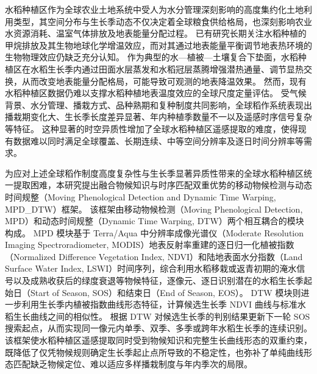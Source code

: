 \cleardoublepage
{}
水稻种植区作为全球农业土地系统中受人为水分管理深刻影响的高度集约化土地利用类型，其空间分布与生长季动态不仅决定着全球粮食供给格局，也深刻影响农业水资源消耗、温室气体排放及地表能量分配过程。
已有研究长期关注水稻种植的甲烷排放及其生物地球化学增温效应，而对其通过地表能量平衡调节地表热环境的生物物理效应仍缺乏充分认知。
作为典型的水—植被—土壤复合下垫面，水稻种植区在水稻生长季内通过田面水层蒸发和水稻冠层蒸腾增强潜热通量、调节显热交换，从而改变地表能量分配格局，可能导致可观测的地表降温效果。
然而，现有水稻种植区数据仍难以支撑水稻种植地表温度效应的全球尺度定量评估。
受气候背景、水分管理、播栽方式、品种熟期和复种制度共同影响，全球稻作系统表现出播栽期变化大、生长季长度差异显著、年内种植季数量不一以及遥感时序信号复杂等特征。
这种显著的时空异质性增加了全球水稻种植区遥感提取的难度，使得现有数据难以同时满足全球覆盖、长期连续、中等空间分辨率及逐日时间分辨率等需求。

为应对上述全球稻作制度高度复杂性与生长季显著异质性带来的全球水稻种植区统一提取困难，本研究提出融合物候知识与时序匹配双重优势的移动物候检测与动态时间规整（Moving Phenological Detection and Dynamic Time Warping, MPD\_DTW）框架。
该框架由移动物候检测（Moving Phenological Detection, MPD）和动态时间规整（Dynamic Time Warping, DTW）两个相互耦合的模块构成。
MPD 模块基于 Terra/Aqua 中分辨率成像光谱仪（Moderate Resolution Imaging Spectroradiometer, MODIS）地表反射率重建的逐日归一化植被指数（Normalized Difference Vegetation Index, NDVI）和陆地表面水分指数（Land Surface Water Index, LSWI）时间序列，综合利用水稻移栽或返青初期的淹水信号以及成熟收获后的绿度衰退等物候特征，逐像元、逐日识别潜在的水稻生长季起始日（Start of Season, SOS）和结束日（End of Season, EOS）。
DTW 模块则进一步利用生长季内植被指数曲线形态特征，计算候选生长季 NDVI 曲线与标准水稻生长曲线之间的相似性。%
根据 DTW 对候选生长季的判别结果更新下一轮 SOS 搜索起点，从而实现同一像元内单季、双季、多季或跨年水稻生长季的连续识别。
该框架使水稻种植区遥感提取同时受到物候知识和完整生长曲线形态的双重约束，既降低了仅凭物候规则确定生长季起止点所导致的不稳定性，也弥补了单纯曲线形态匹配缺乏物候定位、难以适应多样播栽制度与年内季次的局限。

